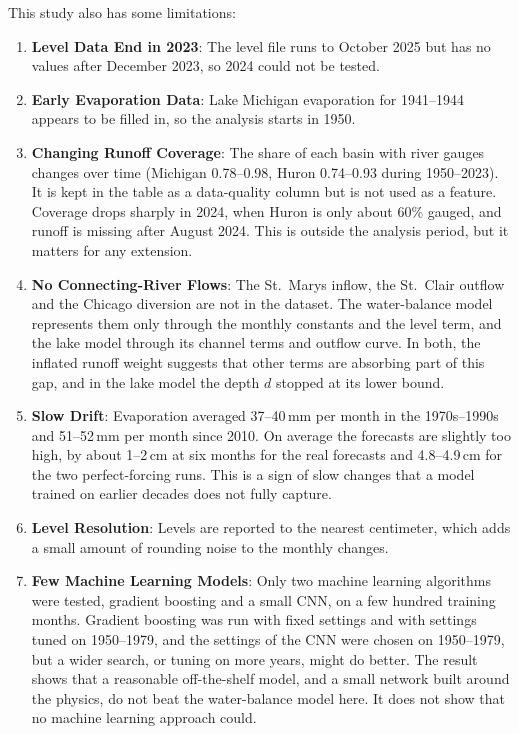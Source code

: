 \documentclass{article}
\begin{document}
This study also has some limitations:
\label{sec:limitations}
\begin{enumerate}
\item \textbf{Level Data End in 2023}: The level file runs to October 2025 but has no values after
December 2023, so 2024 could not be tested.
\item \textbf{Early Evaporation Data}: Lake Michigan evaporation for 1941--1944 appears to be
filled in, so the analysis starts in 1950.
\item \textbf{Changing Runoff Coverage}: The share of each basin with river gauges changes over
time (Michigan 0.78--0.98, Huron 0.74--0.93 during 1950--2023). It is kept in the table as a
data-quality column but is not used as a feature. Coverage drops sharply in 2024, when Huron is
only about 60\% gauged, and runoff is missing after August 2024. This is outside the analysis
period, but it matters for any extension.
\item \textbf{No Connecting-River Flows}: The St.~Marys inflow, the St.~Clair outflow and the
Chicago diversion are not in the dataset. The water-balance model represents them only through
the monthly constants and the level term, and the lake model through its channel terms and
outflow curve. In both, the inflated runoff weight suggests that other terms are absorbing part
of this gap, and in the lake model the depth $d$ stopped at its lower bound.
\item \textbf{Slow Drift}: Evaporation averaged 37--40\,mm per month in the 1970s--1990s and
51--52\,mm per month since 2010. On average the forecasts are slightly too high, by about
1--2\,cm at six months for the real forecasts and 4.8--4.9\,cm for the two perfect-forcing runs.
This is a
sign of slow changes that a model trained on earlier decades does not fully capture.
\item \textbf{Level Resolution}: Levels are reported to the nearest centimeter, which adds a
small amount of rounding noise to the monthly changes.
\item \textbf{Few Machine Learning Models}: Only two machine learning algorithms were tested,
gradient boosting and a small CNN, on a few hundred training months. Gradient boosting was run
with fixed settings and with settings tuned on 1950--1979, and the settings of the CNN were chosen
on 1950--1979, but a wider search, or tuning on more years, might do better. The result shows that
a reasonable off-the-shelf model, and a small network built around the physics, do not beat the
water-balance model here. It does not show that no machine learning approach could.

\end{enumerate}
\end{document}
